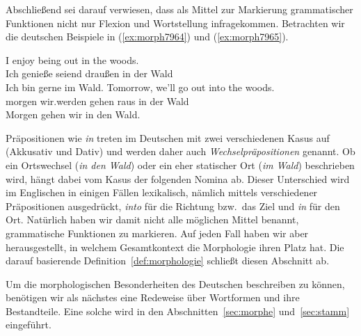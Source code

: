 Abschließend sei darauf verwiesen, dass als Mittel zur Markierung grammatischer Funktionen nicht nur Flexion und Wortstellung infragekommen.
Betrachten wir die deutschen Beispiele in (\ref{ex:morph7964}) und (\ref{ex:morph7965}).

\begin{exe}
  \ex \label{ex:morph7964}
  \begin{xlist}
  \end{xlist}
  \ex \label{ex:morph7965}
  \begin{xlist}
    \ex\gll I enjoy being out in the woods.\\
    Ich genieße seiend draußen in der Wald\\
    \glt Ich bin gerne im Wald. 
    \ex\gll Tomorrow, {we'll} go out into the woods.\\
    morgen {wir.werden} gehen raus in der Wald\\
    \glt Morgen gehen wir in den Wald.
  \end{xlist}
\end{exe}


Präpositionen wie \textit{in} treten im Deutschen mit zwei verschiedenen Kasus auf (Akkusativ und Dativ) und werden daher auch \textit{Wechselpräpositionen} genannt.
Ob ein Ortswechsel (\textit{in den Wald}) oder ein eher statischer Ort (\textit{im Wald}) beschrieben wird, hängt dabei vom Kasus der folgenden Nomina ab.
Dieser Unterschied wird \zB im Englischen in einigen Fällen lexikalisch, nämlich mittels verschiedener Präpositionen ausgedrückt, \textit{into} für die Richtung bzw.\ das Ziel und \textit{in} für den Ort.
Natürlich haben wir damit nicht alle möglichen Mittel benannt, grammatische Funktionen zu markieren.
Auf jeden Fall haben wir aber herausgestellt, in welchem Gesamtkontext die Morphologie ihren Platz hat.
Die darauf basierende Definition~\ref{def:morphologie} schließt diesen Abschnitt ab.


Um die morphologischen Besonderheiten des Deutschen beschreiben zu können, benötigen wir als nächstes eine Redeweise über Wortformen und ihre Bestandteile.
Eine solche wird in den Abschnitten~\ref{sec:morphe} und~\ref{sec:stamm} eingeführt.

